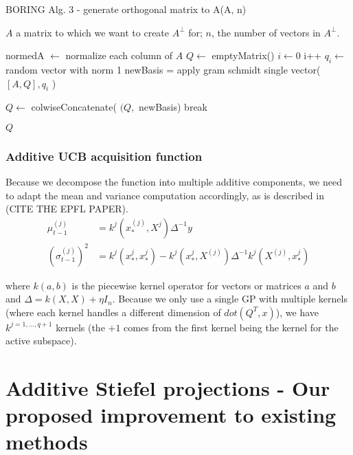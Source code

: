 \begin{algorithm}[H]
\caption{BORING Alg. 3 - generate orthogonal matrix to A(A, n) }

\begin{algorithmic} 
\REQUIRE $A$ a matrix to which we want to create $A^{\bot}$ for; $n$, the number of vectors in $A^{\bot}$.

\STATE normedA $ \leftarrow $ normalize each column of $A$
\STATE $Q \leftarrow$ emptyMatrix()
\STATE $i \leftarrow 0$ 
\STATE i++
\STATE $q_i \leftarrow $ random vector with norm 1
\STATE newBasis = apply gram schmidt single vector( $[A, Q], q_i$ ) 

\STATE $Q \leftarrow$ colwiseConcatenate( $(Q, $ newBasis)
\STATE break
\ENDIF
\ENDWHILE                
\ENDFOR

\RETURN $Q$
\end{algorithmic}
\end{algorithm}

\subsubsection{Additive UCB acquisition function}

Because we decompose the function into multiple additive components, we need to adapt the mean and variance computation accordingly, as is described in (CITE THE EPFL PAPER). \\

\begin{align}
\mu_{t-1}^{(j)} &= k^j(x_*^{(j)}, X^j)\Delta^{-1}y \\
\left( \sigma_{t-1}^{(j)} \right)^2 &= k^j(x_*^{j}, x_*^{j}) - k^j(x_*^j, X^{(j)}) \Delta^{-1} k^j(X^{(j)}, x_*^j)
\end{align}

where $k(a, b)$ is the piecewise kernel operator for vectors or matrices $a$ and $b$ and $\Delta = k(X, X) + \eta I_n$.
Because we only use a single GP with multiple kernels (where each kernel handles a different dimension of $dot(Q^T, x)$), we have $k^{j=1, \ldots, q+1}$ kernels (the $+1$ comes from the first kernel being the kernel for the active subspace). 


\section{Additive Stiefel projections - Our proposed improvement to existing methods}

